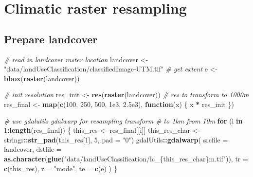 \documentclass[]{article}
\newenvironment{Shaded}{\begin{snugshade}}{\end{snugshade}}
\newcommand{\CommentTok}[1]{\textcolor[rgb]{0.56,0.35,0.01}{\textit{#1}}}
\newcommand{\ControlFlowTok}[1]{\textcolor[rgb]{0.13,0.29,0.53}{\textbf{#1}}}
\newcommand{\DataTypeTok}[1]{\textcolor[rgb]{0.13,0.29,0.53}{#1}}
\newcommand{\DecValTok}[1]{\textcolor[rgb]{0.00,0.00,0.81}{#1}}
\newcommand{\FloatTok}[1]{\textcolor[rgb]{0.00,0.00,0.81}{#1}}
\newcommand{\KeywordTok}[1]{\textcolor[rgb]{0.13,0.29,0.53}{\textbf{#1}}}
\newcommand{\NormalTok}[1]{#1}
\newcommand{\OperatorTok}[1]{\textcolor[rgb]{0.81,0.36,0.00}{\textbf{#1}}}
\newcommand{\StringTok}[1]{\textcolor[rgb]{0.31,0.60,0.02}{#1}}
\begin{document}
\hypertarget{climatic-raster-resampling}{%
\section{Climatic raster resampling}\label{climatic-raster-resampling}}

\hypertarget{prepare-landcover}{%
\subsection{Prepare landcover}\label{prepare-landcover}}

\begin{Shaded}
\begin{Highlighting}[numbers=left,,]
\CommentTok{# read in landcover raster location}
\NormalTok{landcover <-}\StringTok{ "data/landUseClassification/classifiedImage-UTM.tif"}
\CommentTok{# get extent}
\NormalTok{e <-}\StringTok{ }\KeywordTok{bbox}\NormalTok{(}\KeywordTok{raster}\NormalTok{(landcover))}

\CommentTok{# init resolution}
\NormalTok{res_init <-}\StringTok{ }\KeywordTok{res}\NormalTok{(}\KeywordTok{raster}\NormalTok{(landcover))}
\CommentTok{# res to transform to 1000m}
\NormalTok{res_final <-}\StringTok{ }\KeywordTok{map}\NormalTok{(}\KeywordTok{c}\NormalTok{(}\DecValTok{100}\NormalTok{, }\DecValTok{250}\NormalTok{, }\DecValTok{500}\NormalTok{, }\FloatTok{1e3}\NormalTok{, }\FloatTok{2.5e3}\NormalTok{), }\ControlFlowTok{function}\NormalTok{(x) \{}
\NormalTok{  x }\OperatorTok{*}\StringTok{ }\NormalTok{res_init}
\NormalTok{\})}

\CommentTok{# use gdalutils gdalwarp for resampling transform}
\CommentTok{# to 1km from 10m}
\ControlFlowTok{for}\NormalTok{ (i }\ControlFlowTok{in} \DecValTok{1}\OperatorTok{:}\KeywordTok{length}\NormalTok{(res_final)) \{}
\NormalTok{  this_res <-}\StringTok{ }\NormalTok{res_final[[i]]}
\NormalTok{  this_res_char <-}\StringTok{ }\NormalTok{stringr}\OperatorTok{::}\KeywordTok{str_pad}\NormalTok{(this_res[}\DecValTok{1}\NormalTok{], }\DecValTok{5}\NormalTok{, }\DataTypeTok{pad =} \StringTok{"0"}\NormalTok{)}
\NormalTok{  gdalUtils}\OperatorTok{::}\KeywordTok{gdalwarp}\NormalTok{(}
    \DataTypeTok{srcfile =}\NormalTok{ landcover,}
    \DataTypeTok{dstfile =} \KeywordTok{as.character}\NormalTok{(}\KeywordTok{glue}\NormalTok{(}\StringTok{"data/landUseClassification/lc_\{this_res_char\}m.tif"}\NormalTok{)),}
    \DataTypeTok{tr =} \KeywordTok{c}\NormalTok{(this_res), }\DataTypeTok{r =} \StringTok{"mode"}\NormalTok{, }\DataTypeTok{te =} \KeywordTok{c}\NormalTok{(e)}
\NormalTok{  )}
\NormalTok{\}}
\end{Highlighting}
\end{Shaded}
\end{document}
